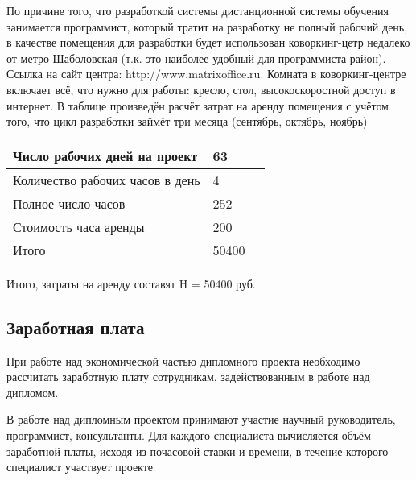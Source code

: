 По причине того, что разработкой системы дистанционной системы обу\-чения занимается программист, который тратит на разработку не полный рабочий день, в качестве помещения для разработки будет использован ковор\-кинг-цетр недалеко от метро Шаболовская (т.к. это наиболее удобный для программиста район). Ссылка на сайт центра: http://www.matrixoffice.ru. Ком\-ната в коворкинг-центре включает всё, что нужно для работы: кресло, стол, высокоскоростной доступ в интернет.
В таблице произведён расчёт затрат на аренду помещения с учётом того, что цикл разработки займёт три месяца (сентябрь, октябрь, ноябрь)

\begin{table}[H]
\begin{center}
\begin{tabular}{|p{3.5cm}|p{3.6cm}|p{3.6cm}|}
\hline
Число рабочих дней на проект&
63\\
\hline
Количество рабочих часов в день&
4\\
\hline
Полное число часов&
252\\
\hline
Стоимость часа аренды&
200\\
\hline
Итого&
50400\\
\hline
\end{tabular}
\end{center}
\end{table}

Итого, затраты на аренду составят H = 50400 руб.

\subsection{Заработная плата}

При работе над экономической частью дипломного проекта необходимо рассчитать заработную плату сотрудникам, задействованным в работе над дипломом.

В работе над дипломным проектом принимают участие научный руко\-водитель, программист, консультанты. Для каждого специалиста вычисляется объём заработной платы, исходя из почасовой ставки и  времени, в течение которого специалист участвует  проекте


